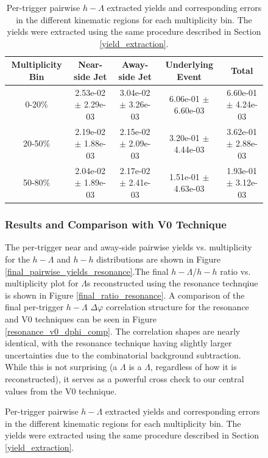 \documentclass[ALICE,manyauthors]{ALICE_analysis_notes}
\begin{document}
\begin{figure}[ht]
\begin{table}[h!]
\centering
\begin{tabular}{| c | c | c | c | c | }
\hline
Multiplicity Bin & Near-side Jet & Away-side Jet & Underlying Event & Total  \\
\hline

0-20\% & 2.53e-02 $\pm$ 2.29e-03 & 3.04e-02 $\pm$ 3.26e-03 & 6.06e-01 $\pm$ 6.60e-03 & 6.60e-01 $\pm$ 4.24e-03 \\
20-50\% & 2.19e-02 $\pm$ 1.88e-03 & 2.15e-02 $\pm$ 2.09e-03 & 3.20e-01 $\pm$ 4.44e-03 & 3.62e-01 $\pm$ 2.88e-03 \\
50-80\% & 2.04e-02 $\pm$ 1.89e-03 & 2.17e-02 $\pm$ 2.41e-03 & 1.51e-01 $\pm$ 4.63e-03 & 1.93e-01 $\pm$ 3.12e-03 \\

\hline
\end{tabular}
\caption{Per-trigger pairwise $h-\Lambda$ extracted yields and corresponding errors in the different kinematic regions for each multiplicity bin. The yields were extracted using the same procedure described in Section \ref{yield_extraction}.}
\label{yield_table_resonance}
\end{table}

\subsubsection{Results and Comparison with V0 Technique}
The per-trigger near and away-side pairwise yields vs. multiplicity for the $h-\Lambda$ and $h-h$ distributions are shown in Figure \ref{final_pairwise_yields_resonance}.The final $h-\Lambda$/$h-h$ ratio vs. multiplicity plot for $\Lambda$s reconstructed using the resonance technqiue is shown in Figure \ref{final_ratio_resonance}. A comparison of the final per-trigger $h-\Lambda$ $\Delta\varphi$ correlation structure for the resonance and V0 techniques can be seen in Figure \ref{resonance_v0_dphi_comp}. The correlation shapes are nearly identical, with the resonance technique having slightly larger uncertainties due to the combinatorial background subtraction. While this is not surprising (a $\Lambda$ is a $\Lambda$, regardless of how it is reconstructed), it serves as a powerful cross check to our central values from the V0 technique.


\end{figure}
\end{document}
